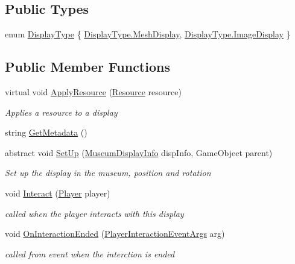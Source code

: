 \subsection*{Public Types}
\begin{DoxyCompactItemize}
\item 
enum \mbox{\hyperlink{class_display_a7f7abc559192ef7e8f4a03382d3492d7}{Display\+Type}} \{ \mbox{\hyperlink{class_display_a7f7abc559192ef7e8f4a03382d3492d7a6465642df623349960f917dcf68ba989}{Display\+Type.\+Mesh\+Display}}, 
\mbox{\hyperlink{class_display_a7f7abc559192ef7e8f4a03382d3492d7a6790a36b5a0528029d4ed43891266fcb}{Display\+Type.\+Image\+Display}}
 \}
\end{DoxyCompactItemize}
\subsection*{Public Member Functions}
\begin{DoxyCompactItemize}
\item 
virtual void \mbox{\hyperlink{class_display_aa1d23e0e870c59c63e2f040e84ef0121}{Apply\+Resource}} (\mbox{\hyperlink{class_resource}{Resource}} resource)
\begin{DoxyCompactList}\small\item\em Applies a resource to a display \end{DoxyCompactList}\item 
string \mbox{\hyperlink{class_display_a293687a976cbe23a09b7c6ddef36a48d}{Get\+Metadata}} ()
\item 
abstract void \mbox{\hyperlink{class_display_a57325251fbeac943cd48520e50f0bec4}{Set\+Up}} (\mbox{\hyperlink{class_museum_display_info}{Museum\+Display\+Info}} disp\+Info, Game\+Object parent)
\begin{DoxyCompactList}\small\item\em Set up the display in the museum, position and rotation \end{DoxyCompactList}\item 
void \mbox{\hyperlink{class_display_a43fc2a6f19bbf2f1bdb676392b37e921}{Interact}} (\mbox{\hyperlink{class_player}{Player}} player)
\begin{DoxyCompactList}\small\item\em called when the player interacts with this display \end{DoxyCompactList}\item 
void \mbox{\hyperlink{class_display_a29f45efdf15e97219d2c8a614d699da8}{On\+Interaction\+Ended}} (\mbox{\hyperlink{class_player_interaction_event_args}{Player\+Interaction\+Event\+Args}} arg)
\begin{DoxyCompactList}\small\item\em called from event when the interction is ended \end{DoxyCompactList}\end{DoxyCompactItemize}
